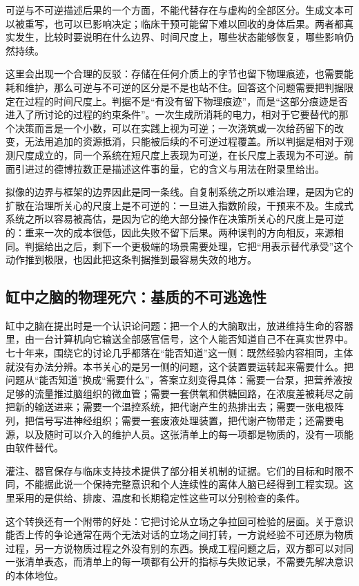 可逆与不可逆描述后果的一个方面，不能代替存在与虚构的全部区分。生成文本可以被重写，也可以已影响决定；临床干预可能留下难以回收的身体后果。两者都真实发生，比较时要说明在什么边界、时间尺度上，哪些状态能够恢复，哪些影响仍然持续。

这里会出现一个合理的反驳：存储在任何介质上的字节也留下物理痕迹，也需要能耗和维护，那么可逆与不可逆的区分是不是也站不住。回答这个问题需要把判据限定在过程的时间尺度上。判据不是“有没有留下物理痕迹”，而是“这部分痕迹是否进入了所讨论的过程的约束条件”。一次生成所消耗的电力，相对于它要替代的那个决策而言是一个小数，可以在实践上视为可逆；一次浇筑或一次给药留下的改变，无法用追加的资源抵消，只能被后续的不可逆过程覆盖。所以判据是相对于观测尺度成立的，同一个系统在短尺度上表现为可逆，在长尺度上表现为不可逆。前面引进过的德博拉数正是描述这件事的量，它的含义与用法在附录里给出。

拟像的边界与框架的边界因此是同一条线。自复制系统之所以难治理，是因为它的扩散在治理所关心的尺度上是不可逆的：一旦进入指数阶段，干预来不及。生成式系统之所以容易被高估，是因为它的绝大部分操作在决策所关心的尺度上是可逆的：重来一次的成本很低，因此失败不留下后果。两种误判的方向相反，来源相同。判据给出之后，剩下一个更极端的场景需要处理，它把“用表示替代承受”这个动作推到极限，也因此把这条判据推到最容易失效的地方。

\subsection{缸中之脑的物理死穴：基质的不可逃逸性}


缸中之脑在提出时是一个认识论问题：把一个人的大脑取出，放进维持生命的容器里，由一台计算机向它输送全部感官信号，这个人能否知道自己不在真实世界中。七十年来，围绕它的讨论几乎都落在“能否知道”这一侧：既然经验内容相同，主体就没有办法分辨。本书关心的是另一侧的问题，这个装置要运转起来需要什么。把问题从“能否知道”换成“需要什么”，答案立刻变得具体：需要一台泵，把营养液按足够的流量推过脑组织的微血管；需要一套供氧和供糖回路，在浓度差被耗尽之前把新的输送进来；需要一个温控系统，把代谢产生的热排出去；需要一张电极阵列，把信号写进神经组织；需要一套废液处理装置，把代谢产物带走；还需要电源，以及随时可以介入的维护人员。这张清单上的每一项都是物质的，没有一项能由软件替代。

灌注、器官保存与临床支持技术提供了部分相关机制的证据。它们的目标和时限不同，不能据此说一个保持完整意识和个人连续性的离体人脑已经得到工程实现。这里采用的是供给、排废、温度和长期稳定性这些可以分别检查的条件。

这个转换还有一个附带的好处：它把讨论从立场之争拉回可检验的层面。关于意识能否上传的争论通常在两个无法对话的立场之间打转，一方说经验不可还原为物质过程，另一方说物质过程之外没有别的东西。换成工程问题之后，双方都可以对同一张清单表态，而清单上的每一项都有公开的指标与失败记录，不需要先解决意识的本体地位。

